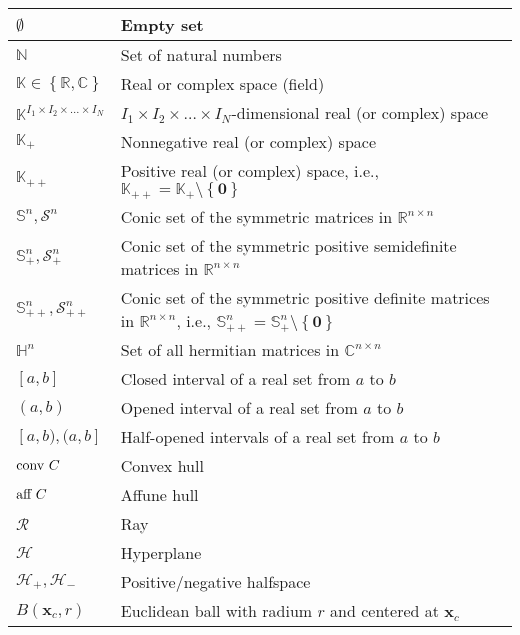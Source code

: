 \documentclass{article}
\begin{document}
\begin{xltabular}{\textwidth}{XX}
    \(\emptyset\) & Empty set\\ \hline
    \(\mathbb{N}\) & Set of natural numbers\\ \hline
    \(\mathbb{K} \in \left\{ \mathbb{R}, \mathbb{C} \right\}\) & Real or complex space (field)\\ \hline
    \(\mathbb{K}^{I_1\times I_2 \times \dots \times I_N}\) & \(I_1\times I_2 \times \dots \times I_N\)-dimensional real (or complex) space\\ \hline
    \(\mathbb{K}_{+}\) & Nonnegative real (or complex) space \cite{boydConvexOptimization2004}\\ \hline
    \(\mathbb{K}_{++}\) & Positive real (or complex) space, i.e., \(\mathbb{K}_{++} = \mathbb{K}_{+}\setminus\left\{ \mathbf{0} \right\}\) \cite{boydConvexOptimization2004}\\ \hline
    \(\mathbb{S}^{n}, \mathcal{S}^{n}\) & Conic set of the symmetric matrices in \(\mathbb{R}^{n\times n}\) \cite{boydConvexOptimization2004}\\ \hline
    \(\mathbb{S}_{+}^{n}, \mathcal{S}_{+}^{n}\) & Conic set of the symmetric positive semidefinite matrices in \(\mathbb{R}^{n\times n}\) \cite{boydConvexOptimization2004}\\ \hline
    \(\mathbb{S}_{++}^{n}, \mathcal{S}_{++}^{n}\) & Conic set of the symmetric positive definite matrices in \(\mathbb{R}^{n\times n}\), i.e., \(\mathbb{S}_{++}^{n} = \mathbb{S}_{+}^{n}\setminus \left\{ \mathbf{0} \right\}\) \cite{boydConvexOptimization2004}\\ \hline
    \(\mathbb{H}^{n}\) & Set of all hermitian matrices in \(\mathbb{C}^{n\times n}\)\\ \hline
    \([a, b]\) & Closed interval of a real set from \(a\) to \(b\)\\ \hline
    \((a, b)\) & Opened interval of a real set from \(a\) to \(b\)\\ \hline
    \([a, b), (a, b]\) & Half-opened intervals of a real set from \(a\) to \(b\)\\
    \(\textnormal{conv } C\) & Convex hull \\ \hline
    \(\textnormal{aff } C\) & Affune hull \\ \hline
    \(\mathcal{R}\) & Ray \\ \hline
    \(\mathcal{H}\) & Hyperplane \\ \hline
    \(\mathcal{H}_{+}, \mathcal{H}_{-}\) & Positive/negative halfspace\\ \hline
    \(B(\mathbf{x}_c, r)\) & Euclidean ball with radium \(r\) and centered at \(\mathbf{x}_c\) \\ \hline

\end{xltabular}
\end{document}
